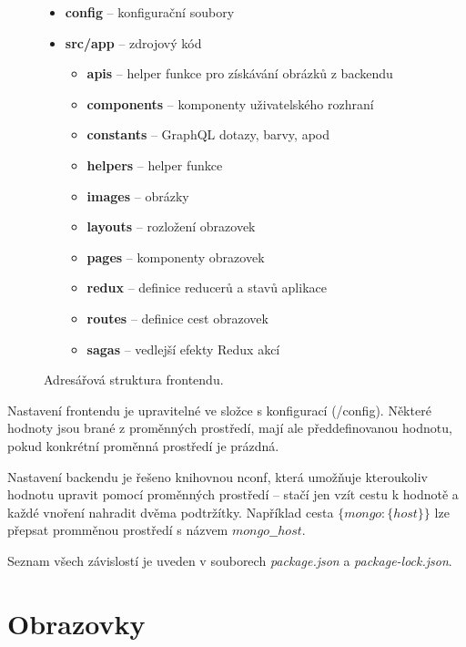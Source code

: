 \begin{figure}[!htb]
    \begin{itemize}
      \setlength\itemsep{.05em}
      \item \textbf{config} -- konfigurační soubory
      \item \textbf{src/app} -- zdrojový kód
      \begin{itemize}
        \setlength\itemsep{.05em}
        \item \textbf{apis} -- helper funkce pro získávání obrázků z backendu
        \item \textbf{components} -- komponenty uživatelského rozhraní
        \item \textbf{constants} -- GraphQL dotazy, barvy, apod
        \item \textbf{helpers} -- helper funkce
        \item \textbf{images} -- obrázky
        \item \textbf{layouts} -- rozložení obrazovek
        \item \textbf{pages} -- komponenty obrazovek
        \item \textbf{redux} -- definice reducerů a stavů aplikace
        \item \textbf{routes} -- definice cest obrazovek
        \item \textbf{sagas} -- vedlejší efekty Redux akcí
      \end{itemize}
    \end{itemize}
    \caption{Adresářová struktura frontendu.}
    \label{fig:structure_front}
  \end{figure}

\newpage

Nastavení frontendu je upravitelné ve složce s konfigurací (/config).
Některé hodnoty jsou brané z proměnných prostředí, mají ale předdefinovanou hodnotu, pokud
konkrétní proměnná prostředí je prázdná.

Nastavení backendu je řešeno knihovnou nconf, která umožňuje kteroukoliv hodnotu upravit
pomocí proměnných prostředí -- stačí jen vzít cestu k hodnotě a každé vnoření nahradit 
dvěma podtržítky.
\citep[viz][]{nconf}
Například cesta $\{ mongo: \{ host \} \}$ lze přepsat promměnou prostředí s názvem $mongo\_\_host$.

Seznam všech závislostí je uveden v souborech \textit{package.json} a \textit{package-lock.json}.

\section{Obrazovky}

